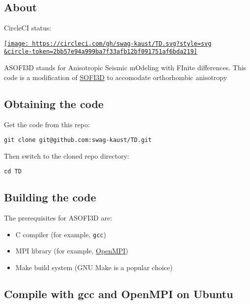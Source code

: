\subsection{About}\label{about}

CircleCI status:

\href{https://circleci.com/gh/swag-kaust/TD}{\texttt{[image: https://circleci.com/gh/swag-kaust/TD.svg?style=svg\\\&circle-token=2bb57e94a999ba7f33afb12bf091751af6bda219]}}

ASOFI3D stands for Anisotropic Seismic mOdeling with FInite differences.
This code is a modification of
\href{https://git.scc.kit.edu/GPIAG-Software/SOFI3D/wikis/home}{SOFI3D}
to accomodate orthorhombic anisotropy

\subsection{Obtaining the code}\label{obtaining-the-code}

Get the code from this repo:

\begin{verbatim}
git clone git@github.com:swag-kaust/TD.git
\end{verbatim}

Then switch to the cloned repo directory:

\begin{verbatim}
cd TD
\end{verbatim}

\subsection{Building the code}\label{building-the-code}

The prerequisites for ASOFI3D are:

\begin{itemize}
\tightlist
\item
  C compiler (for example, \texttt{gcc})
\item
  MPI library (for example, \href{https://www.open-mpi.org/}{OpenMPI})
\item
  Make build system (GNU Make is a popular choice)
\end{itemize}

\subsection{Compile with gcc and OpenMPI on
Ubuntu}\label{compile-with-gcc-and-openmpi-on-ubuntu}


